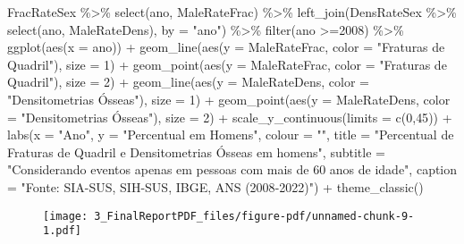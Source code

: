 \documentclass[
  letterpaper,
  DIV=11,
  numbers=noendperiod]{scrartcl}
\newenvironment{Shaded}{\begin{snugshade}}{\end{snugshade}}
\newcommand{\AttributeTok}[1]{\textcolor[rgb]{0.40,0.45,0.13}{#1}}
\newcommand{\DecValTok}[1]{\textcolor[rgb]{0.68,0.00,0.00}{#1}}
\newcommand{\FunctionTok}[1]{\textcolor[rgb]{0.28,0.35,0.67}{#1}}
\newcommand{\NormalTok}[1]{\textcolor[rgb]{0.00,0.23,0.31}{#1}}
\newcommand{\SpecialCharTok}[1]{\textcolor[rgb]{0.37,0.37,0.37}{#1}}
\newcommand{\StringTok}[1]{\textcolor[rgb]{0.13,0.47,0.30}{#1}}
\begin{document}
\begin{Shaded}
\begin{Highlighting}[]
\NormalTok{FracRateSex }\SpecialCharTok{\%\textgreater{}\%} 
  \FunctionTok{select}\NormalTok{(ano, MaleRateFrac) }\SpecialCharTok{\%\textgreater{}\%} 
  \FunctionTok{left\_join}\NormalTok{(DensRateSex }\SpecialCharTok{\%\textgreater{}\%} \FunctionTok{select}\NormalTok{(ano, MaleRateDens), }\AttributeTok{by =} \StringTok{"ano"}\NormalTok{) }\SpecialCharTok{\%\textgreater{}\%} 
  \FunctionTok{filter}\NormalTok{(ano }\SpecialCharTok{\textgreater{}=}\DecValTok{2008}\NormalTok{) }\SpecialCharTok{\%\textgreater{}\%} 
  \FunctionTok{ggplot}\NormalTok{(}\FunctionTok{aes}\NormalTok{(}\AttributeTok{x =}\NormalTok{ ano)) }\SpecialCharTok{+}
  \FunctionTok{geom\_line}\NormalTok{(}\FunctionTok{aes}\NormalTok{(}\AttributeTok{y =}\NormalTok{ MaleRateFrac, }\AttributeTok{color =} \StringTok{"Fraturas de Quadril"}\NormalTok{), }\AttributeTok{size =} \DecValTok{1}\NormalTok{) }\SpecialCharTok{+}
  \FunctionTok{geom\_point}\NormalTok{(}\FunctionTok{aes}\NormalTok{(}\AttributeTok{y =}\NormalTok{ MaleRateFrac, }\AttributeTok{color =} \StringTok{"Fraturas de Quadril"}\NormalTok{), }\AttributeTok{size =} \DecValTok{2}\NormalTok{) }\SpecialCharTok{+}
  \FunctionTok{geom\_line}\NormalTok{(}\FunctionTok{aes}\NormalTok{(}\AttributeTok{y =}\NormalTok{ MaleRateDens, }\AttributeTok{color =} \StringTok{"Densitometrias Ósseas"}\NormalTok{), }\AttributeTok{size =} \DecValTok{1}\NormalTok{) }\SpecialCharTok{+}
  \FunctionTok{geom\_point}\NormalTok{(}\FunctionTok{aes}\NormalTok{(}\AttributeTok{y =}\NormalTok{ MaleRateDens, }\AttributeTok{color =} \StringTok{"Densitometrias Ósseas"}\NormalTok{), }\AttributeTok{size =} \DecValTok{2}\NormalTok{) }\SpecialCharTok{+}
  \FunctionTok{scale\_y\_continuous}\NormalTok{(}\AttributeTok{limits =} \FunctionTok{c}\NormalTok{(}\DecValTok{0}\NormalTok{,}\DecValTok{45}\NormalTok{)) }\SpecialCharTok{+}
  \FunctionTok{labs}\NormalTok{(}\AttributeTok{x =} \StringTok{"Ano"}\NormalTok{, }\AttributeTok{y =} \StringTok{"Percentual em Homens"}\NormalTok{, }\AttributeTok{colour =} \StringTok{""}\NormalTok{, }\AttributeTok{title =} \StringTok{"Percentual de Fraturas de Quadril e Densitometrias Ósseas em homens"}\NormalTok{,}
       \AttributeTok{subtitle =} \StringTok{"Considerando eventos apenas em pessoas com mais de 60 anos de idade"}\NormalTok{,}
       \AttributeTok{caption =} \StringTok{"Fonte: SIA{-}SUS, SIH{-}SUS, IBGE, ANS (2008{-}2022)"}\NormalTok{) }\SpecialCharTok{+}
  \FunctionTok{theme\_classic}\NormalTok{()}
\end{Highlighting}
\end{Shaded}

\begin{figure}[H]

{\centering \texttt{[image: 3\_FinalReportPDF\_files/figure-pdf/unnamed-chunk-9-1.pdf]}

}

\end{figure}
\end{document}
